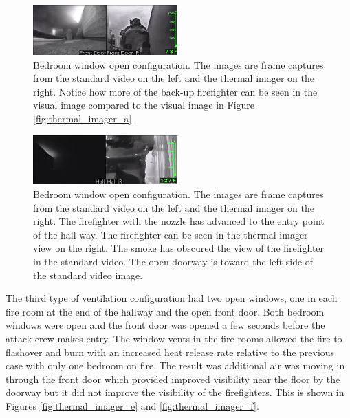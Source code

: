 \documentclass[12pt,oneside]{book}
\begin{document}
\begin{figure}[H]
\centering
\includegraphics[width=0.495\textwidth]{../0_Images/Tactical_Considerations/Thermal_Imager/Exp8FDpair.png}
\caption[Thermal Imager C]{Bedroom window open configuration.  The images are frame captures from the standard video on the left and the thermal imager on the right. Notice how more of the back-up firefighter can be seen in the visual image compared to the visual image in Figure \ref{fig:thermal_imager_a}.}
\label{fig:thermal_imager_c}
\end{figure}

\begin{figure}[H]
\centering
\includegraphics[width=0.495\textwidth]{../0_Images/Tactical_Considerations/Thermal_Imager/Exp8Hallpair.png}
\caption[Thermal Imager D]{Bedroom window open configuration. The images are frame captures from the standard video on the left and the thermal imager on the right. The firefighter with the nozzle has advanced to the entry point of the hall way. The firefighter can be seen in the thermal imager view on the right. The smoke has obscured the view of the firefighter in the standard video. The open doorway is toward the left side of the standard video image.}
\label{fig:thermal_imager_d}
\end{figure}

The third type of ventilation configuration had two open windows, one in each fire room at the end of the hallway and the open front door. Both bedroom windows were open and the front door was opened a few seconds before the attack crew makes entry. The window vents in the fire rooms allowed the fire to flashover and burn with an increased heat release rate relative to the previous case with only one bedroom on fire. The result was additional air was moving in through the front door which provided improved visibility near the floor by the doorway but it did not improve the visibility of the firefighters. This is shown in Figures \ref{fig:thermal_imager_e} and \ref{fig:thermal_imager_f}. 
\end{document}
